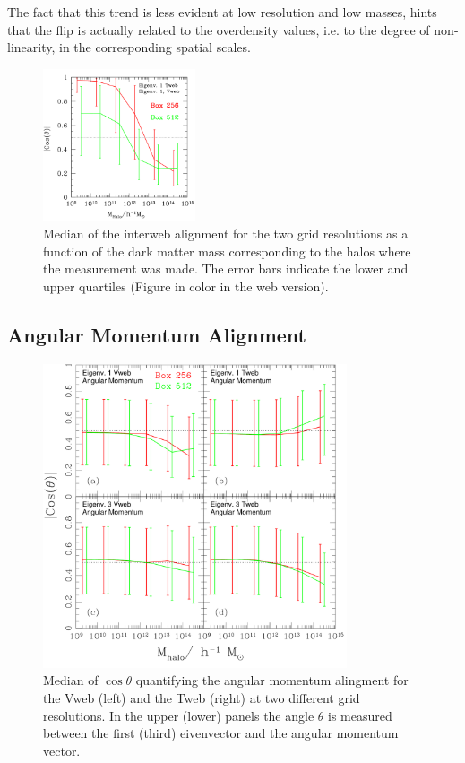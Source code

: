 \documentclass[usenatbib]{mn2e}
\begin{document}
The fact that this trend is less evident at low resolution and low
masses, hints that the flip is actually related to the overdensity
values, i.e. to the degree of non-linearity, in the corresponding
spatial scales.





\begin{figure}
\includegraphics[width=0.40\textwidth]{web.pdf}
\caption{Median of the interweb alignment for the two grid
  resolutions as a function of the dark matter mass corresponding to
  the halos where the measurement was made. The error bars indicate
  the lower and upper quartiles (Figure in color in the web version).
\label{fig:interweb}} 
\end{figure}

\subsection{Angular Momentum Alignment}



\begin{figure}
\includegraphics[width=0.80\textwidth]{Fig3.pdf}
\caption{Median of $\cos\theta$ quantifying the angular momentum
  alingment for the Vweb (left) and the Tweb (right) at two different
  grid resolutions. In the upper (lower)  panels the angle $\theta$ is
  measured between the first (third) eivenvector and the angular
  momentum vector.\label{fig:spin_alignment}} 
\end{figure}
\end{document}
